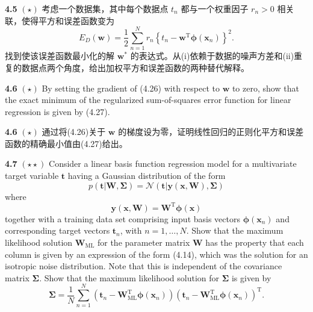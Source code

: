 \documentclass{article}
\begin{document}
\textbf{4.5} $(\star)$ 考虑一个数据集，其中每个数据点 $t_n$ 都与一个权重因子 $r_n > 0$ 相关联，使得平方和误差函数变为
\begin{equation}
E_D(\mathbf{w}) = \frac{1}{2} \sum_{n=1}^{N} r_n \left\{ t_n - \mathbf{w}^{\mathrm{T}} \boldsymbol{\phi}(\mathbf{x}_n) \right\}^2. \tag{4.60}
\end{equation}
找到使该误差函数最小化的解 $\mathbf{w}^*$ 的表达式。从(i)依赖于数据的噪声方差和(ii)重复的数据点两个角度，给出加权平方和误差函数的两种替代解释。


\textbf{4.6} $(\star)$ By setting the gradient of (4.26) with respect to $\mathbf{w}$ to zero, show that the exact minimum of the regularized sum-of-squares error function for linear regression is given by (4.27).

\textbf{4.6} $(\star)$ 通过将(4.26)关于 $\mathbf{w}$ 的梯度设为零，证明线性回归的正则化平方和误差函数的精确最小值由(4.27)给出。


\textbf{4.7} $(\star\star)$ Consider a linear basis function regression model for a multivariate target variable $\mathbf{t}$ having a Gaussian distribution of the form
\begin{equation}
p(\mathbf{t}|\mathbf{W}, \boldsymbol{\Sigma}) = \mathcal{N}(\mathbf{t}|\mathbf{y}(\mathbf{x}, \mathbf{W}), \boldsymbol{\Sigma}) \tag{4.61}
\end{equation}
where
\begin{equation}
\mathbf{y}(\mathbf{x}, \mathbf{W}) = \mathbf{W}^{\mathrm{T}} \boldsymbol{\phi}(\mathbf{x}) \tag{4.62}
\end{equation}
together with a training data set comprising input basis vectors $\boldsymbol{\phi}(\mathbf{x}_n)$ and corresponding target vectors $\mathbf{t}_n$, with $n = 1, \dots, N$. Show that the maximum likelihood solution $\mathbf{W}_{\text{ML}}$ for the parameter matrix $\mathbf{W}$ has the property that each column is given by an expression of the form (4.14), which was the solution for an isotropic noise distribution. Note that this is independent of the covariance matrix $\boldsymbol{\Sigma}$. Show that the maximum likelihood solution for $\boldsymbol{\Sigma}$ is given by
\begin{equation}
\boldsymbol{\Sigma} = \frac{1}{N} \sum_{n=1}^{N} \left( \mathbf{t}_n - \mathbf{W}_{\text{ML}}^{\mathrm{T}} \boldsymbol{\phi}(\mathbf{x}_n) \right) \left( \mathbf{t}_n - \mathbf{W}_{\text{ML}}^{\mathrm{T}} \boldsymbol{\phi}(\mathbf{x}_n) \right)^{\mathrm{T}}. \tag{4.63}
\end{equation}
\end{document}
